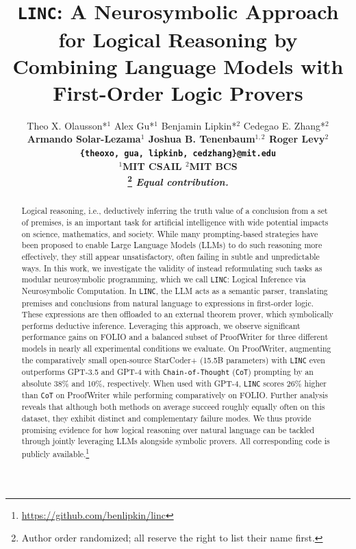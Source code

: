 \documentclass[11pt]{article}
\title{\emojilink\texttt{LINC}: A Neurosymbolic Approach for Logical Reasoning by Combining Language Models with First-Order Logic Provers}
\author{Theo X. Olausson*$^1$ \quad Alex Gu*$^1$ \quad Benjamin Lipkin*$^2$ \quad Cedegao E. Zhang*$^2$ \\
\bf Armando Solar-Lezama$^1$ \quad Joshua B. Tenenbaum$^{1,2}$ \quad Roger Levy$^2$ \\
\texttt{\{theoxo, gua, lipkinb, cedzhang\}@mit.edu} \\
$^1$MIT CSAIL $^2$MIT BCS \\
\thanks{\quad Author order randomized; all reserve the right to list their name first.}
\textit{Equal contribution.}
\\
}
\begin{document}
\maketitle

\begin{abstract}
Logical reasoning, i.e., deductively inferring the truth value of a conclusion from a set of premises, is an important task for artificial intelligence with wide potential impacts on science, mathematics, and society.
While many prompting-based strategies have been proposed to enable Large Language Models (LLMs) to do such reasoning more effectively,
they still appear unsatisfactory, often failing in subtle and unpredictable ways.
In this work, we investigate the validity of instead reformulating such tasks as modular neurosymbolic programming, which we call \texttt{LINC}: Logical Inference via Neurosymbolic Computation.
In \texttt{LINC}, the LLM acts as a semantic parser, translating premises and conclusions from natural language to expressions in first-order logic.
These expressions are then offloaded to an external theorem prover, which symbolically performs deductive inference.
Leveraging this approach, we observe significant performance gains on FOLIO and a balanced subset of ProofWriter for three different models in nearly all experimental conditions we evaluate.
On ProofWriter, augmenting the comparatively small open-source StarCoder+ (15.5B parameters) with \texttt{LINC} even outperforms GPT-3.5 and GPT-4 with \texttt{Chain-of-Thought} (\texttt{CoT}) prompting by an absolute 38\% and 10\%, respectively.
When used with GPT-4, \texttt{LINC} scores 26\% higher than \texttt{CoT} on ProofWriter while performing comparatively on FOLIO.
Further analysis reveals that although both methods on average succeed roughly equally often on this dataset, they exhibit distinct and complementary failure modes.
We thus provide promising evidence for how logical reasoning over natural language can be tackled through jointly leveraging LLMs alongside symbolic provers.
All corresponding code 
is publicly available.\footnote{\quad \url{https://github.com/benlipkin/linc}}
\end{abstract}

\end{document}
